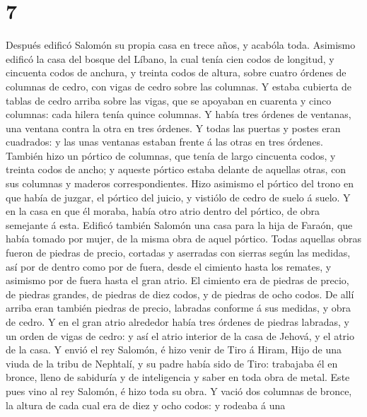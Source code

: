 \hypertarget{section-6}{%
\section{7}\label{section-6}}

 Después edificó Salomón su propia casa en trece años, y
acabóla toda.  Asimismo edificó la casa del bosque del
Líbano, la cual tenía cien codos de longitud, y cincuenta codos de
anchura, y treinta codos de altura, sobre cuatro órdenes de columnas de
cedro, con vigas de cedro sobre las columnas.  Y estaba
cubierta de tablas de cedro arriba sobre las vigas, que se apoyaban en
cuarenta y cinco columnas: cada hilera tenía quince columnas.
 Y había tres órdenes de ventanas, una ventana contra la
otra en tres órdenes.  Y todas las puertas y postes eran
cuadrados: y las unas ventanas estaban frente á las otras en tres
órdenes.  También hizo un pórtico de columnas, que tenía
de largo cincuenta codos, y treinta codos de ancho; y aqueste pórtico
estaba delante de aquellas otras, con sus columnas y maderos
correspondientes.  Hizo asimismo el pórtico del trono en
que había de juzgar, el pórtico del juicio, y vistiólo de cedro de suelo
á suelo.  Y en la casa en que él moraba, había otro atrio
dentro del pórtico, de obra semejante á esta. Edificó también Salomón
una casa para la hija de Faraón, que había tomado por mujer, de la misma
obra de aquel pórtico.  Todas aquellas obras fueron de
piedras de precio, cortadas y aserradas con sierras según las medidas,
así por de dentro como por de fuera, desde el cimiento hasta los
remates, y asimismo por de fuera hasta el gran atrio.  El
cimiento era de piedras de precio, de piedras grandes, de piedras de
diez codos, y de piedras de ocho codos.  De allí arriba
eran también piedras de precio, labradas conforme á sus medidas, y obra
de cedro.  Y en el gran atrio alrededor había tres
órdenes de piedras labradas, y un orden de vigas de cedro: y así el
atrio interior de la casa de Jehová, y el atrio de la casa.
 Y envió el rey Salomón, é hizo venir de Tiro á Hiram,
 Hijo de una viuda de la tribu de Nephtalí, y su padre
había sido de Tiro: trabajaba él en bronce, lleno de sabiduría y de
inteligencia y saber en toda obra de metal. Este pues vino al rey
Salomón, é hizo toda su obra.  Y vació dos columnas de
bronce, la altura de cada cual era de diez y ocho codos: y rodeaba á una
